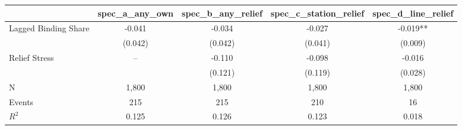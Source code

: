 \begin{tabular}{lcccc}
\toprule
 & spec_a_any_own & spec_b_any_relief & spec_c_station_relief & spec_d_line_relief \\
\midrule
Lagged Binding Share & -0.041 & -0.034 & -0.027 & -0.019** \\
 & (0.042) & (0.042) & (0.041) & (0.009) \\
Relief Stress & -- & -0.110 & -0.098 & -0.016 \\
 &  & (0.121) & (0.119) & (0.028) \\
\midrule
N & 1,800 & 1,800 & 1,800 & 1,800 \\
Events & 215 & 215 & 210 & 16 \\
$R^2$ & 0.125 & 0.126 & 0.123 & 0.018 \\
\bottomrule
\end{tabular}
